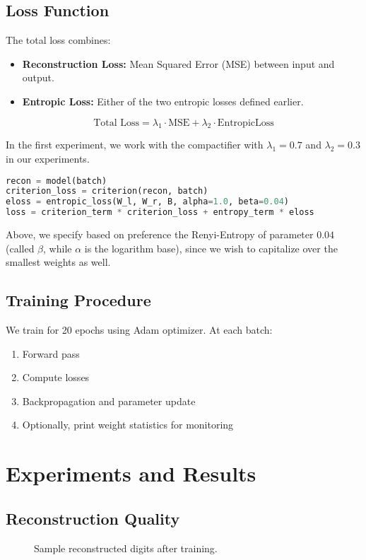 \documentclass[12pt]{article}
\begin{document}
\subsection{Loss Function}
The total loss combines:
\begin{itemize}
    \item \textbf{Reconstruction Loss:} Mean Squared Error (MSE) between input and output.
    \item \textbf{Entropic Loss:} Either of the two entropic losses defined earlier.
\end{itemize}
\[
\text{Total Loss} = \lambda_1 \cdot \text{MSE} + \lambda_2 \cdot \text{EntropicLoss}
\]

In the first experiment, we work with the compactifier with $\lambda_1 = 0.7$ and $\lambda_2 = 0.3$ in our experiments.

\begin{lstlisting}[language=Python,caption={Loss Computation}]
recon = model(batch)
criterion_loss = criterion(recon, batch)
eloss = entropic_loss(W_l, W_r, B, alpha=1.0, beta=0.04)
loss = criterion_term * criterion_loss + entropy_term * eloss
\end{lstlisting}

Above, we specify based on preference the Renyi-Entropy of parameter \(0.04\) (called \(\beta\), while \(\alpha\) is the logarithm base), since we wish to capitalize over the smallest weights as well.

\subsection{Training Procedure}
We train for 20 epochs using Adam optimizer. At each batch:
\begin{enumerate}
    \item Forward pass
    \item Compute losses
    \item Backpropagation and parameter update
    \item Optionally, print weight statistics for monitoring
\end{enumerate}

\section{Experiments and Results}

\subsection{Reconstruction Quality}
\begin{figure}[h!]
    \centering
    \caption{Sample reconstructed digits after training.}
\end{figure}
\end{document}
